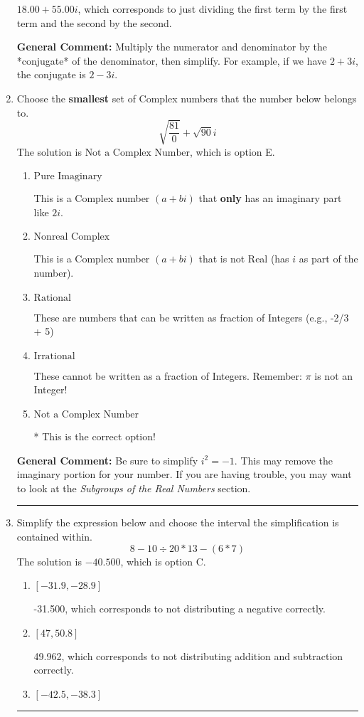 \documentclass{extbook}[14pt]
\newcommand{\litem}[1]{\item #1

\rule{\textwidth}{0.4pt}}
\begin{document}
\begin{enumerate}
{\begin{enumerate}[label=\Alph*.]
 $18.00  + 55.00 i$, which corresponds to just dividing the first term by the first term and the second by the second.
\end{enumerate}

\textbf{General Comment:} Multiply the numerator and denominator by the *conjugate* of the denominator, then simplify. For example, if we have $2+3i$, the conjugate is $2-3i$.
}
\litem{
Choose the \textbf{smallest} set of Complex numbers that the number below belongs to.
\[ \sqrt{\frac{81}{0}}+\sqrt{90} i \]The solution is \( \text{Not a Complex Number} \), which is option E.\begin{enumerate}[label=\Alph*.]
\item \( \text{Pure Imaginary} \)

This is a Complex number $(a+bi)$ that \textbf{only} has an imaginary part like $2i$.
\item \( \text{Nonreal Complex} \)

This is a Complex number $(a+bi)$ that is not Real (has $i$ as part of the number).
\item \( \text{Rational} \)

These are numbers that can be written as fraction of Integers (e.g., -2/3 + 5)
\item \( \text{Irrational} \)

These cannot be written as a fraction of Integers. Remember: $\pi$ is not an Integer!
\item \( \text{Not a Complex Number} \)

* This is the correct option!
\end{enumerate}

\textbf{General Comment:} Be sure to simplify $i^2 = -1$. This may remove the imaginary portion for your number. If you are having trouble, you may want to look at the \textit{Subgroups of the Real Numbers} section.
}
\litem{
Simplify the expression below and choose the interval the simplification is contained within.
\[ 8 - 10 \div 20 * 13 - (6 * 7) \]The solution is \( -40.500 \), which is option C.\begin{enumerate}[label=\Alph*.]
\item \( [-31.9, -28.9] \)

 -31.500, which corresponds to not distributing a negative correctly.
\item \( [47, 50.8] \)

 49.962, which corresponds to not distributing addition and subtraction correctly.
\item \( [-42.5, -38.3] \)


\end{enumerate}}
\end{enumerate}
\end{document}
